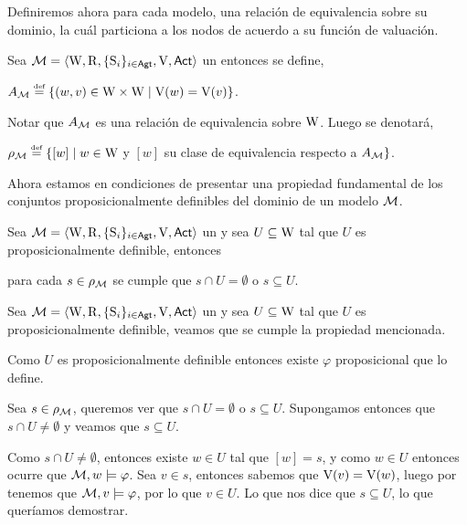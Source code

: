 Definiremos ahora para cada modelo, una relación de equivalencia sobre su dominio, la cuál particiona a los nodos de acuerdo
a su función de valuación.

\begin{definicion}\label{def:Am}
    Sea $\mathcal{M}=\langle \mathrm{W},\mathrm{R},\{ \mathrm{S}_i \}_{i \in {\rm \sf Agt}},\mathrm{V},{\rm \sf Act} \rangle$ un \ults entonces se define, 
    \begin{center}
        $A_\modults \eqdef \{(w,v) \in \W \times \W \mid \V(w) = \V(v)\}$.
    \end{center}
    Notar que $A_{\mathcal{M}}$ es una relación de equivalencia sobre $\mathrm{W}$. Luego se denotará,
    \begin{center}
        $\rho_\modults \eqdef \{ [w] \mid w \in \W $ y $[w]$ su clase de equivalencia respecto a $A_{\mathcal{M}}\}$.
    \end{center}
\end{definicion}

Ahora estamos en condiciones de presentar una propiedad fundamental de los conjuntos proposicionalmente definibles del dominio de un modelo $\mathcal{M}$.

\begin{lema}\label{lema:propositionally-definable-lemma}
    Sea $\mathcal{M}=\langle \mathrm{W},\mathrm{R},\{ \mathrm{S}_i \}_{i \in {\rm \sf Agt}},\mathrm{V},{\rm \sf Act} \rangle$ un \ults y sea $U \subseteq \mathrm{W}$ tal que $U$ es proposicionalmente definible, entonces
    \begin{center}
        para cada $s \in \rho_{\mathcal{M}}$ se cumple que $s \cap U = \emptyset$ o $s \subseteq U$.
    \end{center}
\end{lema}

\begin{demostracion}
    Sea $\mathcal{M}=\langle \mathrm{W},\mathrm{R},\{ \mathrm{S}_i \}_{i \in {\rm \sf Agt}},\mathrm{V},{\rm \sf Act} \rangle$ un \ults y sea $U \subseteq \mathrm{W}$ tal que $U$ es proposicionalmente definible, 
    veamos que se cumple la propiedad mencionada.

    Como $U$ es proposicionalmente definible entonces existe $\varphi$ proposicional que lo define.

    Sea $s \in \rho_{\mathcal{M}}$, queremos ver que $s \cap U = \emptyset$ o $s \subseteq U$. Supongamos entonces que 
    $s \cap U \neq \emptyset$ y veamos que $s \subseteq U$. 
    
    Como $s \cap U \neq \emptyset$, entonces existe $w \in U$ tal que $[w] = s$, y como $w \in U$ entonces ocurre que 
    $\mathcal{M},w \models \varphi$. Sea $v \in s$, entonces sabemos que $\mathrm{V}(v) = \mathrm{V}(w)$, luego por 
     tenemos que $\mathcal{M},v \models \varphi$, por lo que $v \in U$. Lo que nos dice que 
    $s \subseteq U$, lo que queríamos demostrar.  
\end{demostracion}

